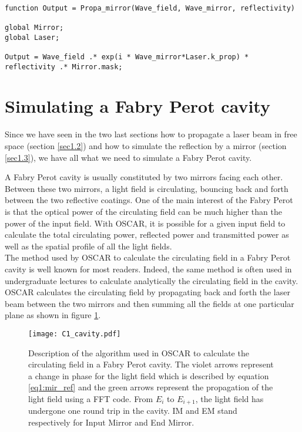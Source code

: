 \begin{lstlisting}[float=htp,caption=The function used to simulate the reflection of an electric field by a mirror\label{lis1:refl1},frame=lines]

function Output = Propa_mirror(Wave_field, Wave_mirror, reflectivity)

global Mirror;
global Laser;

Output = Wave_field .* exp(i * Wave_mirror*Laser.k_prop) * reflectivity .* Mirror.mask;

\end{lstlisting}


\section{Simulating a Fabry Perot cavity}
\label{sec1.4}

Since we have seen in the two last sections how to propagate a laser beam in free space (section \ref{sec1.2}) and how to simulate the reflection by a mirror (section \ref{sec1.3}), we have all what we need to simulate a Fabry Perot cavity.

A Fabry Perot cavity is usually constituted by two mirrors facing each other. Between these two mirrors, a light field is circulating, bouncing back and forth between the two reflective coatings. One of the main interest of the Fabry Perot is that the optical power of the circulating field can be much higher than the power of the input field. With OSCAR, it is possible for a given input field to calculate the total circulating power, reflected power and transmitted power as well as the spatial profile of all the light fields.\\

The method used by OSCAR to calculate the circulating field in a Fabry Perot cavity is well known for most readers. Indeed, the same method is often used in undergraduate lectures to calculate analytically the circulating field in the cavity\cite{Cav_circ}. OSCAR calculates the circulating field by propagating back and forth the laser beam between the two mirrors and then summing all the fields at one particular plane as shown in figure \ref{fig1:cavity}.

\begin{figure}
\begin{center}
\texttt{[image: C1\_cavity.pdf]}
\end{center}
\caption{\label{fig1:cavity} Description of the algorithm used in OSCAR to calculate the circulating field in a Fabry Perot cavity. The violet arrows represent a change in phase for the light field which is described by equation \ref{eq1:mir_ref} and the green arrows represent the propagation of the light field using a FFT code. From $E_i$ to $E_{i+1}$, the light field has undergone one round trip in the cavity. IM and EM stand respectively for Input Mirror and End Mirror.}
\end{figure}

